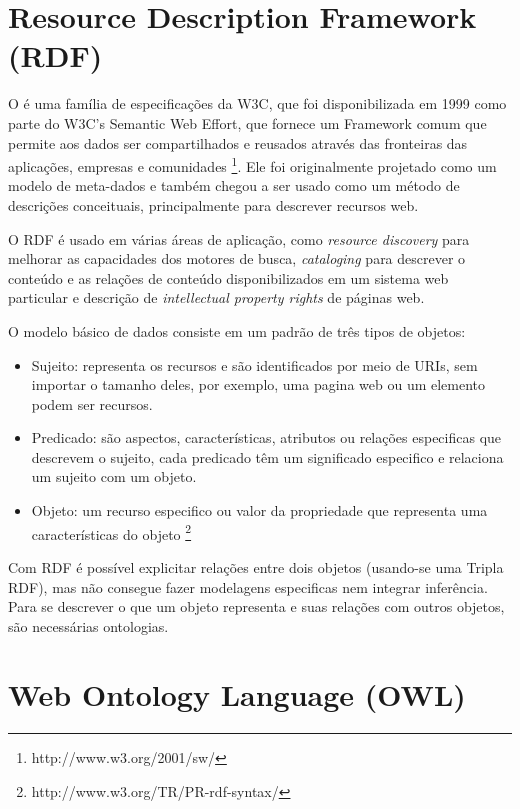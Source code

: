 \section{Resource Description Framework\foreignlanguage{brazil}{ (RDF)}}

%
O \foreignlanguage{english}{}
é uma família de especificações da W3C, que foi disponibilizada em
1999 como parte do W3C's \foreignlanguage{english}{Semantic Web Effort},
que fornece um \foreignlanguage{english}{Framework} comum que permite
aos dados ser compartilhados e reusados através das fronteiras das
aplicações, empresas e comunidades \footnote{http://www.w3.org/2001/sw/}.
Ele foi originalmente projetado como um modelo de meta-dados e também
chegou a ser usado como um método de descrições conceituais, principalmente
para descrever recursos web. 

O RDF é usado em várias áreas de aplicação, como \foreignlanguage{english}{\emph{resource
discovery}} para melhorar as capacidades dos motores de busca, \foreignlanguage{english}{\emph{cataloging}}
para descrever o conteúdo e as relações de conteúdo disponibilizados
em um sistema web particular e descrição de \foreignlanguage{english}{\emph{intellectual
property rights}} de páginas web.

O modelo básico de dados consiste em um padrão de três tipos de objetos:
\begin{itemize}
\item Sujeito: representa os recursos e são identificados por meio de URIs,
sem importar o tamanho deles, por exemplo, uma pagina web ou um elemento
 podem ser recursos.
\item Predicado: são aspectos, características, atributos ou relações especificas
que descrevem o sujeito, cada predicado têm um significado especifico
e relaciona um sujeito com um objeto.
\item Objeto: um recurso especifico ou valor da propriedade que representa
uma características do objeto \footnote{http://www.w3.org/TR/PR-rdf-syntax/}
\end{itemize}
Com RDF é possível explicitar relações entre dois objetos (usando-se
uma Tripla RDF), mas não consegue fazer modelagens especificas nem
integrar inferência. Para se descrever o que um objeto representa
e suas relações com outros objetos, são necessárias ontologias. 

\section{Web Ontology Language (OWL)}

